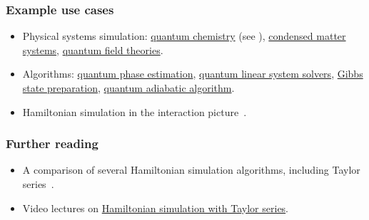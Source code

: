 \begin{refsection}

\subsubsection*{Example use cases}

\begin{itemize}
\item Physical systems simulation: \hyperref[appl:QuantumChemistry]{quantum chemistry} (see \cite{babbush2016ExponentiallySecondQuant,babbush2017ExponentiallyConfigInt,su2021FaultTolerantChemistryFirstQuantized,low2018HamiltonianInteractionPicture}), \hyperref[appl:CondensedMatter]{condensed matter systems}, \hyperref[appl:QuantumFieldTheories]{quantum field theories}. 
\item Algorithms: \hyperref[prim:QPE]{quantum phase estimation}, \hyperref[prim:QuantumLinearSystemSolvers]{quantum linear system solvers}, \hyperref[prim:GibbsSampling]{Gibbs state preparation}, \hyperref[prim:QuantumAdiabaticAlgorithm]{quantum adiabatic algorithm}.
\item Hamiltonian simulation in the interaction picture~\cite{low2018HamiltonianInteractionPicture}.
\end{itemize}


\subsubsection*{Further reading}

\begin{itemize}
    \item A comparison of several Hamiltonian simulation algorithms, including Taylor series~\cite{childs2018towardsFirstQSimSpeedup}.
    \item Video lectures on \href{https://www.youtube.com/watch?v=IPl9eNro6M4}{Hamiltonian simulation with Taylor series}.    
\end{itemize}


\printbibliography[heading=secbib,segment=\therefsegment]
\end{refsection}

\newpage

